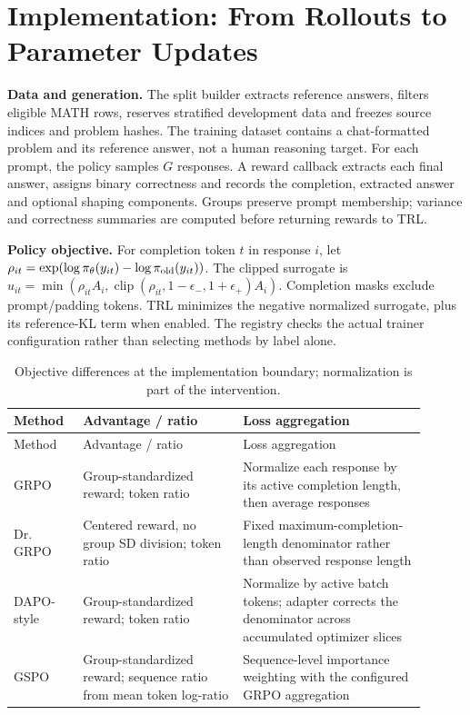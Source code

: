 \clearpage

\section{Implementation: From Rollouts to Parameter Updates}

\textbf{Data and generation.} The split builder extracts reference answers, filters eligible MATH rows, reserves stratified development data and freezes source indices and problem hashes. The training dataset contains a chat-formatted problem and its reference answer, not a human reasoning target. For each prompt, the policy samples $G$ responses. A reward callback extracts each final answer, assigns binary correctness and records the completion, extracted answer and optional shaping components. Groups preserve prompt membership; variance and correctness summaries are computed before returning rewards to TRL.

\textbf{Policy objective.} For completion token $t$ in response $i$, let $\rho_{it}=\exp(\log\pi_\theta(y_{it})-\log\pi_{\rm old}(y_{it}))$. The clipped surrogate is $u_{it}=\min(\rho_{it}A_i,\operatorname{clip}(\rho_{it},1-\epsilon_-,1+\epsilon_+)A_i)$. Completion masks exclude prompt/padding tokens. TRL minimizes the negative normalized surrogate, plus its reference-KL term when enabled. The registry checks the actual trainer configuration rather than selecting methods by label alone.

\begingroup\footnotesize\setlength{\tabcolsep}{3pt}
\begin{longtable}{>{\raggedright\arraybackslash}p{0.1440\linewidth}>{\raggedright\arraybackslash}p{0.3510\linewidth}>{\raggedright\arraybackslash}p{0.4050\linewidth}}
\caption{Objective differences at the implementation boundary; normalization is part of the intervention.}\\
\toprule Method & Advantage /\allowbreak{} ratio & Loss aggregation \\
\midrule\endfirsthead
\toprule Method & Advantage /\allowbreak{} ratio & Loss aggregation \\
\midrule\endhead
\midrule\multicolumn{3}{r}{Continued on next page}\endfoot
\bottomrule\endlastfoot
GRPO & Group-standardized reward; token ratio & Normalize each response by its active completion length, then average responses \\
Dr. GRPO & Centered reward, no group SD division; token ratio & Fixed maximum-completion-length denominator rather than observed response length \\
DAPO-style & Group-standardized reward; token ratio & Normalize by active batch tokens; adapter corrects the denominator across accumulated optimizer slices \\
GSPO & Group-standardized reward; sequence ratio from mean token log-ratio & Sequence-level importance weighting with the configured GRPO aggregation \\
\end{longtable}\endgroup


